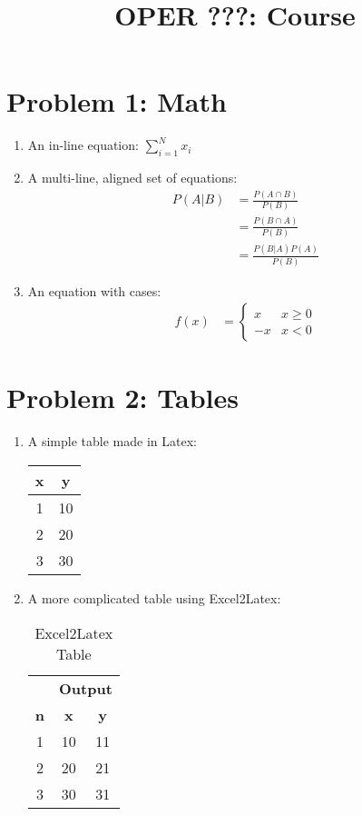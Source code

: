\documentclass{article}
\title{OPER ???: Course \exerciseset}
\author{\studentname}
\begin{document}
\maketitle

\section*{Problem 1: Math}
\begin{enumerate}
\item %
An in-line equation: $\sum_{i=1}^N{x_i}$


\item %
A multi-line, aligned set of equations:
\begin{align*}
P(A \vert B) &= \frac{P(A \cap B)}{P(B)} \\
&= \frac{P(B \cap A)}{P(B)} \\
&= \frac{P(B \vert A)P(A)}{P(B)}
\end{align*}


\item %
An equation with cases:
\begin{align*}
  f(x) &= 
  \begin{cases}
    x & x \geq 0 \\
    -x & x < 0
  \end{cases}
\end{align*}

\end{enumerate}

\section*{Problem 2: Tables}
\begin{enumerate}

\item %
A simple table made in Latex:

\begin{tabular}{c c}
  x & y \\
  \midrule
  1 & 10 \\
  2 & 20 \\
  3 & 30
\end{tabular}


\item %
A more complicated table using Excel2Latex:

\begin{table}[htbp]
  \centering
  \caption{Excel2Latex Table}
    \begin{tabular}{|c|c|c|}
    \toprule
          & \multicolumn{2}{c|}{\textbf{Output}} \\
    \textbf{n} & \multicolumn{1}{c}{\textbf{x}} & \textbf{y} \\
    \midrule
    1     & 10    & 11 \\
    \midrule
    2     & 20    & 21 \\
    \midrule
    3     & 30    & 31 \\
    \bottomrule
    \end{tabular}%
  \label{tab:addlabel}%
\end{table}%

\end{enumerate}
\end{document}
